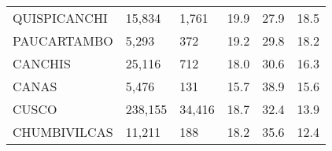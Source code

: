 \begin{tabular}{llllll}
	\cellcolor[HTML]{FF5050}QUISPICANCHI                           & 15,834                                                                & 1,761                                                            & 19.9                                                                             & 27.9                                                                        & 18.5                                                                                \\
	\cellcolor[HTML]{FF5050}PAUCARTAMBO                            & 5,293                                                                 & 372                                                              & 19.2                                                                             & 29.8                                                                        & 18.2                                                                                \\
	\cellcolor[HTML]{FF5050}CANCHIS                                & 25,116                                                                & 712                                                              & 18.0                                                                             & 30.6                                                                        & 16.3                                                                                \\
	\cellcolor[HTML]{FF5050}CANAS                                  & 5,476                                                                 & 131                                                              & 15.7                                                                             & 38.9                                                                        & 15.6                                                                                \\
	\cellcolor[HTML]{F8CBAD}CUSCO                                  & 238,155                                                               & 34,416                                                           & 18.7                                                                             & 32.4                                                                        & 13.9                                                                                \\
	\cellcolor[HTML]{F8CBAD}CHUMBIVILCAS                           & 11,211                                                                & 188                                                              & 18.2                                                                             & 35.6                                                                        & 12.4                                                                                \\

\end{tabular}
